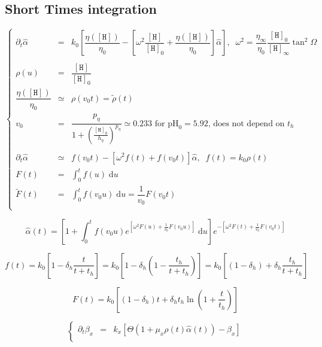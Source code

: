 \documentclass[aps,onecolumn,11pt]{revtex4}
\newcommand{\mychem}[1]{\mathtt{#1}}
\newcommand{\myconc}[1]{\left\lbrack{#1}\right\rbrack}
\newcommand{\spproton}{\mychem{H}}
\newcommand{\proton}{\myconc{\spproton}}
\newcommand{\pH}{\ensuremath{\mathrm{pH}}}
\begin{document}
\subsection{Short Times integration}
\begin{equation}
\left\lbrace
\begin{array}{rcl}
	\partial_t \hat\alpha & = & k_0 \left[ \dfrac{\eta(\proton)}{\eta_0} - \left[ \omega^2 \dfrac{\proton}{\proton_0} + \dfrac{\eta(\proton)}{\eta_0} \right] \hat\alpha \right], \;\; \omega^2 = \dfrac{\eta_\infty}{\eta_0}\dfrac{\proton_0}{\proton_\infty}\tan^2\Omega\\
	\\
	\rho(u) & = & \dfrac{\proton}{\proton_0}\\
	\dfrac{\eta(\proton)}{\eta_0} & \simeq & \rho( v_0 t) = \tilde\rho(t) \\
	v_0 & = & \dfrac{p_\eta}{1+\left(\frac{\proton_0}{h_\eta}\right)^{p_\eta}}\simeq 0.233\text{ for $\pH_0=5.92$, does not depend on $t_h$}\\
	\\
\partial_t\hat\alpha	 & \simeq &  f(v_0t) - \left[ \omega^2 f(t) +  f(v_0t) \right] \hat\alpha,\;\;f(t) = k_0 \rho(t) \\
	 F(t) & = & \int_0^t f(u) \; \mathrm{d}u \\
	 \tilde F(t) & = & \int_0^t f(v_0 u) \; \mathrm{d}u = \dfrac{1}{v_0} F(v_0t)\\
\end{array}
\right.
\end{equation}

\begin{equation}
		 \hat\alpha(t) =  \left[ 1 + \int_0^t f(v_0u) e^{\left[\omega^2 F(u)+\frac{1}{v_0}F(v_0u)\right]}\;\mathrm{d}u\right]
		  e^{-\left[\omega^2 F(t)+\frac{1}{v_0}F(v_0 t)\right]}
\end{equation}

\begin{equation}
	f(t) = k_0\left[ 1 - \delta_h \dfrac{t}{t+t_h} \right] = k_0\left[ 1 - \delta_h \left( 1- \dfrac{t_h}{t+t_h}\right) \right] 
	= k_0 \left[ (1-\delta_h) + \delta_h \dfrac{t_h}{t+t_h}\right]
\end{equation}

\begin{equation}
 F(t) =  k_0 \left[ (1-\delta_h) t + \delta_h t_h \ln\left( 1+ \dfrac{t}{t_h}\right)\right]
\end{equation}

\begin{equation}
\left\lbrace
\begin{array}{rcl}
	\partial_t \beta_x  & = & k_x \left[ \Theta\left( 1 + \mu_x \rho(t) \hat\alpha(t) \right)- \beta_x\right]\\
\end{array}
\right.
\end{equation}
\end{document}

